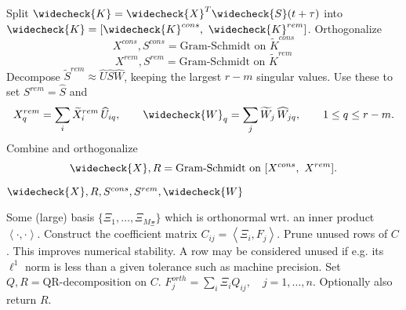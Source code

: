 \begin{algorithm}
\caption{Truncation}
\label{alg:truncate}
\begin{algorithmic}[1]
\State Split $\widecheck{ K } = \widecheck{ X }^T \widecheck{ S }(t + \tau)$ into 
    $\widecheck{ K } = [ \widecheck{ K }^{cons},\ \widecheck{ K }^{rem} ]$. 
\State Orthogonalize 
    \begin{equation*}
        X^{cons}, S^{cons} = \textrm{Gram-Schmidt on } \widetilde{ K }^{cons}
    \end{equation*}
    \begin{equation*}
        X^{rem}, S^{rem} = \textrm{Gram-Schmidt on } \widetilde{ K }^{rem}
    \end{equation*}
\State Decompose $\widetilde{ S }^{rem} \approx \widehat{ U } \widehat{ S } \widehat{ W }$, 
    keeping the largest $r - m$ singular values. Use these to set $S^{rem} = \widehat{ S }$ 
    and 
    \begin{equation*}
        X^{rem}_q = \sum_i \widetilde{ X }^{rem}_i\, \widehat{ U }_{i q} , \quad\quad 
        \widecheck{ W }_q = \sum_j \widetilde{ W }_j\, \widehat{ W }_{j q} , 
        \quad\quad 1 \leq q \leq r - m . 
    \end{equation*}
\State Combine and orthogonalize 
    \begin{equation*}
        \widecheck{ X }, R = \textrm{Gram-Schmidt on } [ X^{cons},\ X^{rem} ] . 
    \end{equation*}
\State \Return $\widecheck{ X }, R, S^{cons}, S^{rem}, \widecheck{ W }$
\end{algorithmic}
\end{algorithm}

\begin{algorithm}
\caption{Gram-Schmidt of functions $F_1, \ldots, F_n$}
\label{alg:gram-schmidt}
\begin{algorithmic}[1]
\Require Some (large) basis $\{ \Xi_1, \ldots, \Xi_{M_\Xi} \}$ which is orthonormal wrt. 
    an inner product $\left\langle \cdot, \cdot \right\rangle$. 
\State Construct the coefficient matrix $C_{i j} = \left\langle \Xi_i, F_j \right\rangle$. 
\State Prune unused rows of $C$. This improves numerical stability. A row may be considered 
    unused if e.g. its $\ell^1$ norm is less than a given tolerance such as machine 
    precision. 
\State Set $Q, R = \textrm{QR-decomposition on } C$. 
\State \Return $F_j^{orth} = \sum_i \Xi_i Q_{i j},\quad j = 1, \ldots, n$. Optionally also return 
    $R$. 
\end{algorithmic}
\end{algorithm}


